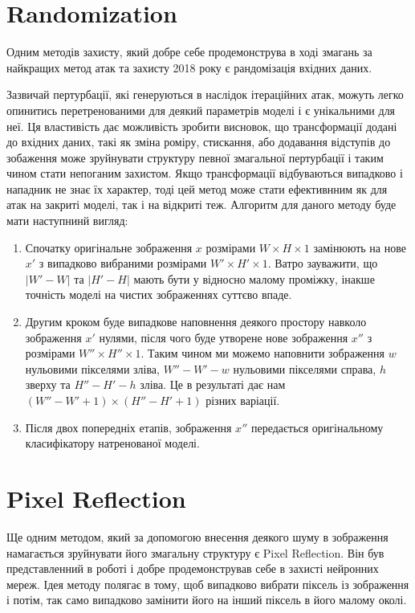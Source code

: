 \documentclass[a4paper,14pt]{extreport}
\begin{document}
	\section{Randomization}
	Одним методів захисту, який добре себе продемонструва в ході змагань за найкращих метод атак та захисту 2018 року \cite{kurakin2018adversarial} є рандомізація вхідних даних.
	
	Зазвичай пертурбації, які генеруються в наслідок ітераційних атак, можуть легко опинитись перетренованими для деякий параметрів моделі і є унікальними для неї. Ця властивість дає можливість зробити висновок, що трансформації додані до вхідних даних, такі як зміна роміру, стискання, або додавання відступів до зобаження може зруйнувати структуру певної змагальної пертурбації і таким чином стати непоганим захистом. Якщо трансформації відбуваються випадково і нападник не знає їх характер, тоді цей метод може стати ефективнним як для атак на закриті моделі, так і на відкриті теж.
	Алгоритм для даного методу буде мати наступнинй вигляд:
	
	\begin{enumerate}
	\item Спочатку оригінальне зображення $x$ розмірами $W \times H \times 1$ замінюють на нове $x'$ з випадково вибраними розмірами $W' \times H' \times 1$. Ватро зауважити, що $|W' - W|$ та $|H' - H|$ мають бути у відносно малому проміжку, інакше точність моделі на чистих зображеннях суттєво впаде.
	\item Другим кроком буде випадкове наповнення деякого простору навколо зображення $x'$ нулями, після чого буде утворене нове зображення $x''$ з розмірами $W'' \times H'' \times 1$. Таким чином ми можемо наповнити зображення $w$ нульовими пікселями зліва, $W'' - W' - w$ нульовими пікселями справа, $h$ зверху та $H'' - H' - h$ зліва. Це в результаті дає нам  $(W''-W'+1) \times (H''- H'+1)$ різних варіації.
	\item Після двох попередніх етапів, зображення $x''$ передається оригінальному класифікатору натренованої моделі.
	\end{enumerate}

	\section{Pixel Reflection}
	Ще одним методом, який за допомогою внесення деякого шуму в зображення намагається зруйнувати його змагальну структуру є Pixel Reflection. Він був представленний в роботі \textcite{prakash2018deflecting} і добре продемонстрував себе в захисті нейронних мереж. Ідея методу полягає в тому, щоб випадково вибрати піксель із зображення і потім, так само випадково замінити його на інший піксель в його малому околі. 
	
\end{document}
